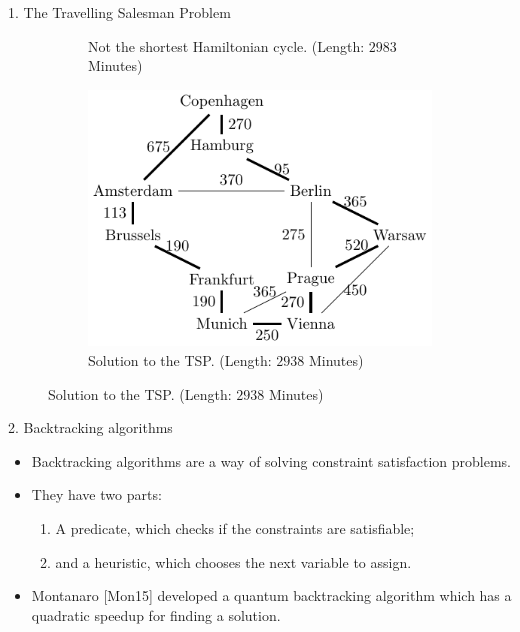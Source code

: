 \documentclass[]{templates/poster}
\begin{document}
\begin{frame}{}
\begin{columns}[t]
\begin{column}{0.422\linewidth}
\begin{block}{\Large 1. The Travelling Salesman Problem}
\begin{center}
\begin{figure}
\begin{subfigure}[t]{0.32\linewidth}
  \caption{ Not the shortest Hamiltonian cycle. (Length: $2983$ Minutes)}
  \end{subfigure}
  \begin{subfigure}[t]{0.32\linewidth}
  \includegraphics[width=\linewidth]{shortest}
  \caption{ Solution to the TSP. (Length: $2938$ Minutes)}
  \end{subfigure}
  \end{figure}
  \end{center}
  \end{block}

  \begin{block}{\Large 2. Backtracking algorithms}
  \begin{itemize}
  \item Backtracking algorithms are a way of solving constraint satisfaction problems.
  
  \item They have two parts:
  \begin{enumerate}
  \item A predicate, which checks if the constraints are satisfiable;
  \item and a heuristic, which chooses the next variable to assign.
\end{enumerate}
  
  \item Montanaro [Mon15] developed a quantum backtracking algorithm which has a quadratic speedup for finding a solution.
  \end{itemize}
  \end{block}
  \end{column}


\end{columns}
\end{frame}
\end{document}
